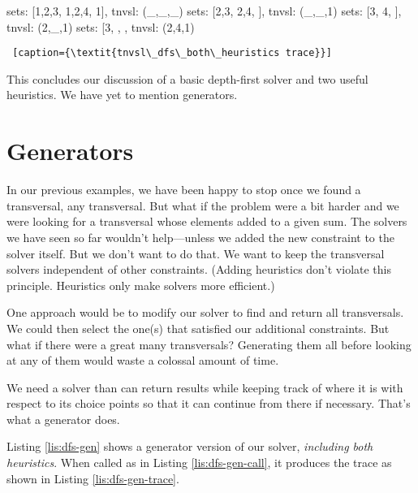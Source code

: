 \midiumlv
\begin{minipage}[c]{0.45\textwidth}
\begin{python1} 
sets: [{1,2,3}, {1,2,4}, {1}], tnvsl: (_,_,_)
  sets: [{2,3}, {2,4}, {}], tnvsl: (_,_,1)
    sets: [{3}, {4}, {}], tnvsl: (2,_,1)
      sets: [{3}, {}, {}, tnvsl: (2,4,1)
\end{python1}\linv
\begin{lstlisting} [caption={\textit{tnvsl\_dfs\_both\_heuristics trace}}]
\end{lstlisting}
\end{minipage}

This concludes our discussion of a basic depth-first solver and two useful heuristics. We have yet to mention generators.

\section{Generators} \label{sec:generators}
In our previous examples, we have been happy to stop once we found a transversal,  any transversal. But what if the problem were a bit harder and we were looking for a transversal whose elements added to a given sum. The solvers we have seen so far wouldn't help---unless we added the new constraint to the solver itself. But we don't want to do that. We want to keep the transversal solvers independent of other constraints. (Adding heuristics don't violate this principle. Heuristics only make solvers more efficient.)

One approach would be to modify our solver to find and return all transversals. We could then select the one(s) that satisfied our additional constraints. But what if there were a great many transversals? Generating them all before looking at any of them would waste a colossal amount of time. 

We need a solver than can return results while keeping track of where it is with respect to its choice points so that it can continue from there if necessary. That's what a generator does. 

Listing \ref{lis:dfs-gen} shows a generator version of our solver, \textit{including both heuristics}. When called as in Listing \ref{lis:dfs-gen-call}, it produces the trace as shown in Listing \ref{lis:dfs-gen-trace}. %

